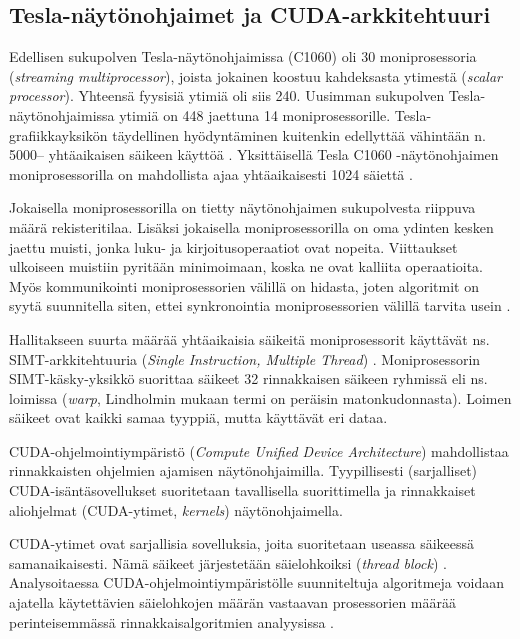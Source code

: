 \documentclass[a4paper,11pt]{article}
\newcommand{\engl}[1]{\foreignlanguage{english}{\em #1}}
\begin{document}
\subsection{Tesla-näytönohjaimet ja CUDA-arkkitehtuuri}

Edellisen sukupolven Tesla-näytönohjaimissa (C1060) oli 30 moniprosessoria \\ (\engl{streaming multiprocessor}), joista jokainen koostuu kahdeksasta ytimestä (\engl{scalar processor}). Yhteensä fyysisiä ytimiä oli siis 240. Uusimman sukupolven Tes\-la-näy\-tön\-oh\-jai\-mis\-sa ytimiä on 448 jaettuna 14 moniprosessorille. Tesla-gra\-fiik\-ka\-yk\-si\-kön täydellinen hyödyntäminen kuitenkin edellyttää vähintään n. 5000\thinspace-- yhtäaikaisen säikeen käyttöä \cite{leischner2010}. Yksittäisellä Tesla C1060 -näytönohjaimen moniprosessorilla on mahdollista ajaa yhtäaikaisesti 1024 säiettä \cite{satish2009}.

Jokaisella moniprosessorilla on tietty näytönohjaimen sukupolvesta riippuva määrä rekisteritilaa. Lisäksi jokaisella moniprosessorilla on oma ydinten kesken jaettu muisti, jonka luku- ja kirjoitusoperaatiot ovat nopeita. Viittaukset ulkoiseen muistiin pyritään minimoimaan, koska ne ovat kalliita operaatioita. Myös kommunikointi moniprosessorien välillä on hidasta, joten algoritmit on syytä suunnitella siten, ettei synkronointia moniprosessorien välillä tarvita usein \cite{kolonias2011}.

Hallitakseen suurta määrää yhtäaikaisia säikeitä moniprosessorit käyttävät ns. SIMT-arkkitehtuuria (\engl{Single Instruction, Multiple Thread}) \cite{lindholm2008}. Moniprosessorin SIMT-käsky-yksikkö suorittaa säikeet 32 rinnakkaisen säikeen ryhmissä eli ns. loimissa (\engl{warp}, Lindholmin \cite{lindholm2008} mukaan termi on peräisin matonkudonnasta). Loimen säikeet ovat kaikki samaa tyyppiä, mutta käyttävät eri dataa.

CUDA-ohjelmointiympäristö (\engl{Compute Unified Device Architecture}) \cite{cudaprogramming} mahdollistaa rinnakkaisten ohjelmien ajamisen näytönohjaimilla. Tyypillisesti (sarjalliset) CUDA-isäntäsovellukset suoritetaan tavallisella suorittimella ja rinnakkaiset aliohjelmat (CUDA-ytimet, \engl{kernels}) näytönohjaimella.

CUDA-ytimet ovat sarjallisia sovelluksia, joita suoritetaan useassa säikeessä samanaikaisesti. Nämä säikeet järjestetään säielohkoiksi (\engl{thread block}) \cite{cudaprogramming}. Analysoitaessa CUDA-ohjelmointiympäristölle suunniteltuja algoritmeja voidaan ajatella käytettävien säielohkojen määrän vastaavan prosessorien määrää perinteisemmässä rinnakkaisalgoritmien analyysissa \cite{satish2009}.
\end{document}

